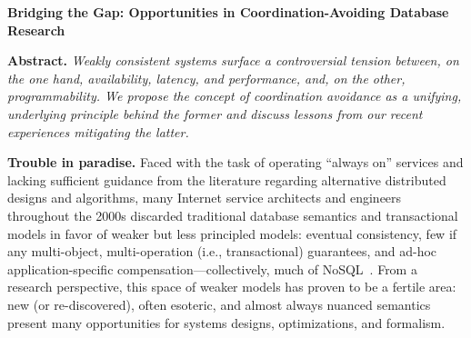 \documentclass[9pt]{article}
\theoremstyle{definition}
\theoremstyle{remark}
\newcommand{\minihead}[1]{{\vspace{.4em}\noindent\textbf{#1.} }}
\begin{document}
\thispagestyle{empty}


%

\begin{center}
{\textbf{\large{Bridging the Gap: Opportunities in Coordination-Avoiding Database Research}}}\\[1mm]
{\fontsize{11pt}{12pt}}
\end{center}\vspace{-.5em}


\noindent\textbf{Abstract.} \textit{Weakly consistent systems surface a controversial tension between, on the one hand, availability, latency, and performance, and, on the other, programmability. We propose the concept of coordination avoidance as a unifying, underlying principle behind the former and discuss lessons from our recent experiences mitigating the latter.}

\minihead{Trouble in paradise} Faced with the task of operating ``always on'' services and lacking sufficient guidance from the literature regarding alternative distributed designs and algorithms, many Internet service architects and engineers throughout the 2000s discarded traditional database semantics and transactional models in favor of weaker but less principled models: eventual consistency, few if any multi-object, multi-operation (i.e., transactional) guarantees, and ad-hoc application-specific compensation---collectively, much of NoSQL~\cite{queue}. From a research perspective, this space of weaker models has proven to be a fertile area: new (or re-discovered), often esoteric, and almost always nuanced semantics present many opportunities for systems designs, optimizations, and formalism.
\end{document}
